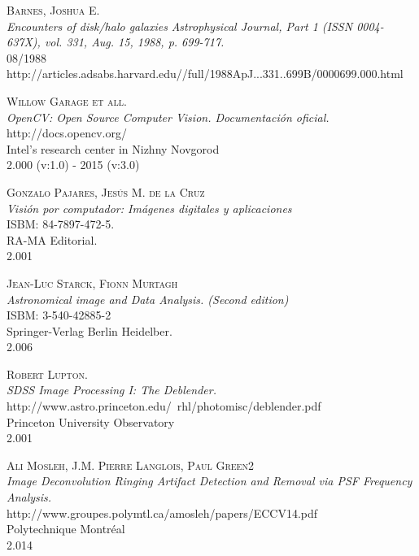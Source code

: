 	\begin{thebibliography}{1}
%
		\textsc{Barnes, Joshua E.} \\
		\textit{Encounters of disk/halo galaxies}
		\textit{Astrophysical Journal, Part 1 (ISSN 0004-637X), vol. 331, Aug. 15, 1988, p. 699-717.}
		\\ 08/1988
		\\http://articles.adsabs.harvard.edu//full/1988ApJ...331..699B/0000699.000.html
		
  		\textsc{Willow Garage et all.} \\
  		\textit{OpenCV: Open Source Computer Vision. Documentación oficial.}
  		\\http://docs.opencv.org/
		\\Intel's research center in Nizhny Novgorod
  		\\2.000 (v:1.0) - 2015 (v:3.0)

  		\textsc{Gonzalo Pajares, Jesús M. de la Cruz} \\
  		\textit{Visión por computador: Imágenes digitales y aplicaciones}
  		\\ISBM: 84-7897-472-5.
  		\\RA-MA Editorial.
  		\\2.001

  		\textsc{Jean-Luc Starck, Fionn Murtagh} \\
  		\textit{Astronomical image and Data Analysis. (Second edition)}
  		\\ISBM: 3-540-42885-2
  		\\Springer-Verlag Berlin Heidelber.
  		\\2.006

	  	
	  	\textsc{Robert Lupton.} \\
	  	\textit{SDSS Image Processing I: The Deblender.}
	  	\\http://www.astro.princeton.edu/~rhl/photomisc/deblender.pdf
		\\Princeton University Observatory
	  	\\2.001
	  	
	  	\textsc{Ali Mosleh, J.M. Pierre Langlois, Paul Green2} \\
	  	\textit{Image Deconvolution Ringing Artifact Detection and Removal via PSF Frequency Analysis.}
	  	\\http://www.groupes.polymtl.ca/amosleh/papers/ECCV14.pdf
	  	\\Polytechnique Montréal
	  	\\2.014
	  		  		

\end{thebibliography}
